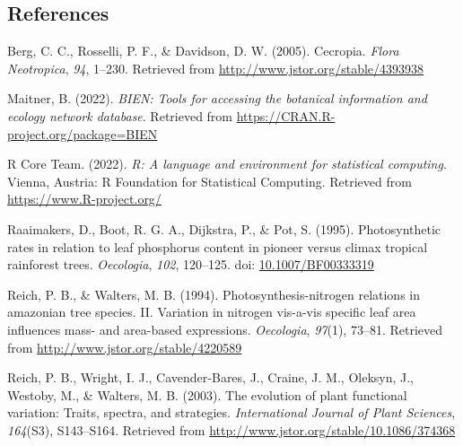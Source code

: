 \documentclass[
  10.5pt,
]{article}
\newlength{\cslhangindent}
\newlength{\cslentryspacingunit} %
\newenvironment{CSLReferences}[2] %
 {%
  \setlength{\parindent}{0pt}
  \ifodd #1
  \let\oldpar\par
  \def\par{\hangindent=\cslhangindent\oldpar}
  \fi
  \setlength{\parskip}{#2\cslentryspacingunit}
 }%
 {}
\begin{document}
\hypertarget{references}{%
\subsection*{References}\label{references}}

\hypertarget{refs}{}
\begin{CSLReferences}{1}{0}
\leavevmode{}%
Berg, C. C., Rosselli, P. F., \& Davidson, D. W. (2005). Cecropia.
\emph{Flora Neotropica}, \emph{94}, 1--230. Retrieved from
\url{http://www.jstor.org/stable/4393938}

\leavevmode{}%
Maitner, B. (2022). \emph{BIEN: Tools for accessing the botanical
information and ecology network database}. Retrieved from
\url{https://CRAN.R-project.org/package=BIEN}

\leavevmode{}%
R Core Team. (2022). \emph{R: A language and environment for statistical
computing}. Vienna, Austria: R Foundation for Statistical Computing.
Retrieved from \url{https://www.R-project.org/}

\leavevmode{}%
Raaimakers, D., Boot, R. G. A., Dijkstra, P., \& Pot, S. (1995).
Photosynthetic rates in relation to leaf phosphorus content in pioneer
versus climax tropical rainforest trees. \emph{Oecologia}, \emph{102},
120--125. doi:
\href{https://doi.org/10.1007/BF00333319}{10.1007/BF00333319}

\leavevmode{}%
Reich, P. B., \& Walters, M. B. (1994). Photosynthesis-nitrogen
relations in amazonian tree species. II. Variation in nitrogen vis-a-vis
specific leaf area influences mass- and area-based expressions.
\emph{Oecologia}, \emph{97}(1), 73--81. Retrieved from
\url{http://www.jstor.org/stable/4220589}

\leavevmode{}%
Reich, P. B., Wright, I. J., Cavender‐Bares, J., Craine, J. M., Oleksyn,
J., Westoby, M., \& Walters, M. B. (2003). The evolution of plant
functional variation: Traits, spectra, and strategies.
\emph{International Journal of Plant Sciences}, \emph{164}(S3),
S143--S164. Retrieved from
\url{http://www.jstor.org/stable/10.1086/374368}

\end{CSLReferences}
\end{document}
